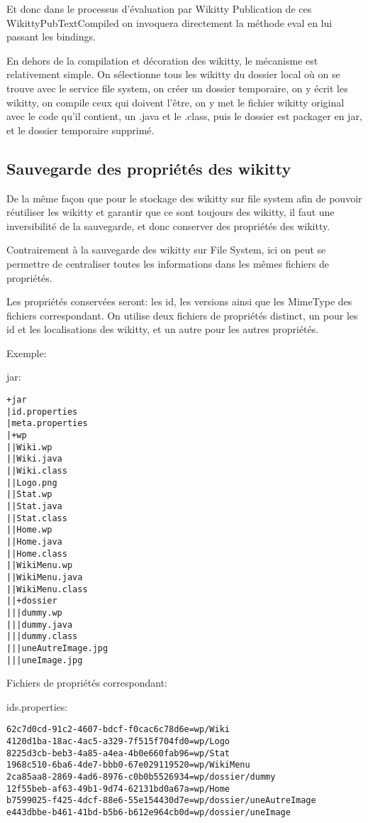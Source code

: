 Et donc dans le processus d'évaluation par Wikitty Publication de ces 
WikittyPubTextCompiled on invoquera directement la méthode eval en lui passant
les bindings.

En dehors de la compilation et décoration des wikitty, le mécanisme est 
relativement simple. On sélectionne tous les wikitty du dossier local où on
se trouve avec le service file system, on créer un dossier temporaire, 
on y écrit les wikitty, on compile ceux qui doivent l'être, on y met le fichier
wikitty original avec le code qu'il contient, un .java et le .class, puis le 
dossier est packager en jar, et le dossier temporaire supprimé.


\subsection{Sauvegarde des propriétés des wikitty}

De la même façon que pour le stockage des wikitty sur file system afin de 
pouvoir réutiliser les wikitty et garantir que ce sont toujours des wikitty,
il faut une inversibilité de la sauvegarde, et donc conserver des propriétés des
wikitty.

Contrairement à la sauvegarde des wikitty sur File System, ici on peut se 
permettre de centraliser toutes les informations dans les mêmes fichiers de 
propriétés. 

Les propriétés conservées seront: les id, les versions ainsi que les MimeType
des fichiers correspondant. On utilise deux fichiers de propriétés distinct, 
un pour les id et les localisations des wikitty, et un autre pour les autres 
propriétés.

Exemple: %

jar:
\begin{verbatim}
+jar
|id.properties
|meta.properties
|+wp
||Wiki.wp
||Wiki.java
||Wiki.class
||Logo.png
||Stat.wp
||Stat.java
||Stat.class
||Home.wp
||Home.java
||Home.class
||WikiMenu.wp
||WikiMenu.java
||WikiMenu.class
||+dossier
|||dummy.wp
|||dummy.java
|||dummy.class
|||uneAutreImage.jpg
|||uneImage.jpg
\end{verbatim}

Fichiers de propriétés correspondant:


ids.properties:
\begin{verbatim}
62c7d0cd-91c2-4607-bdcf-f0cac6c78d6e=wp/Wiki
4120d1ba-18ac-4ac5-a329-7f515f704fd0=wp/Logo
8225d3cb-beb3-4a85-a4ea-4b0e660fab96=wp/Stat
1968c510-6ba6-4de7-bbb0-67e029119520=wp/WikiMenu
2ca85aa8-2869-4ad6-8976-c0b0b5526934=wp/dossier/dummy
12f55beb-af63-49b1-9d74-62131bd0a67a=wp/Home
b7599025-f425-4dcf-88e6-55e154430d7e=wp/dossier/uneAutreImage
e443dbbe-b461-41bd-b5b6-b612e964cb0d=wp/dossier/uneImage
\end{verbatim}


